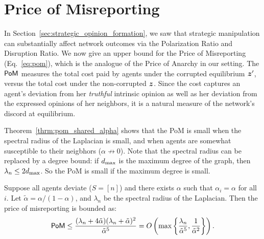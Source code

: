 \section{Price of Misreporting}
In Section~\ref{sec:strategic_opinion_formation}, we saw that strategic manipulation can substantially affect network outcomes via the Polarization Ratio and Disruption Ratio. We now give an upper bound for the Price of Misreporting (Eq.~\eqref{eq:pom}), which is the analogue of the Price of Anarchy in our setting. The $\mathsf{PoM}$ measures the total cost paid by agents under the corrupted equilibrium $\bm{z}^\prime$, versus the total cost under the non-corrupted $\bm{z}$. Since the cost captures an agent's deviation from her {\em truthful} intrinsic opinion as well as her deviation from the expressed opinions of her neighbors, it is a natural measure of the network's discord at equilibrium. 

Theorem~\ref{thrm:pom_shared_alpha} shows that the PoM is small when the spectral radius of the Laplacian is small, and when agents are somewhat susceptible to their neigbhors ($\alpha \not \to 0$). Note that the spectral radius can be replaced by a degree bound: if $d_{\textup{max}}$ is the maximum degree of the graph, then $\lambda_n \leq 2 d_{\textup{max}}$. So the PoM is small if the maximum degree is small.

\begin{theorem}
Suppose all agents deviate ($S = [n]$) and there exists $\alpha$ such that $\alpha_i = \alpha$ for all $i$.
Let $\tilde \alpha = \alpha / (1 - \alpha)$, and $\lambda_n$ be the spectral radius of the Laplacian. Then the price of misreporting is bounded as:
    \begin{align*}
        \mathsf{PoM} \le \frac {(\lambda_n + 4 \tilde \alpha) (\lambda_n + \tilde \alpha)^2} {\tilde \alpha^5} = O \left ( \max \left \{ \frac {\lambda_n} {\tilde \alpha^5}, \frac {1} {\tilde \alpha^2} \right \} \right ).
    \end{align*}
\label{thrm:pom_shared_alpha}
\end{theorem}

